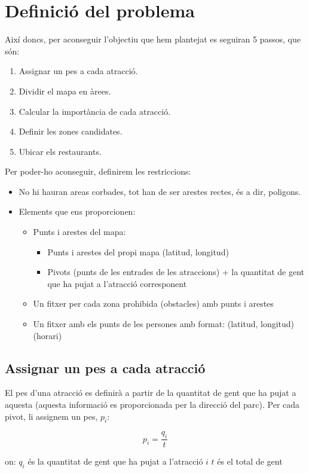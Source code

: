 \documentclass[12pt]{article}
\begin{document}
\clearpage
\section{Definició del problema}
Així doncs, per aconseguir l'objectiu que hem plantejat es seguiran 5 passos, que són:
\begin{enumerate}
	\item Assignar un pes a cada atracció.
	\item Dividir el mapa en àrees.
	\item Calcular la importància de cada atracció.
	\item Definir les zones candidates.
	\item Ubicar els restaurants.
\end{enumerate}
Per poder-ho aconseguir, definirem les restriccions:
\begin{itemize}
\item No hi hauran areas corbades, tot han  de ser arestes rectes, és a dir, poligons.
\item Elements que ens proporcionen:
	\begin{itemize}
	\item Punts i arestes del mapa: 
		\begin{itemize}
		\item Punts i arestes del propi mapa (latitud, longitud)
		\item Pivots (punts de les entrades de les atraccions) + la quantitat de gent que ha pujat a l'atracció corresponent
		\end{itemize}
	\item Un fitxer per cada zona prohibida (obstacles) amb punts i arestes
	\item Un fitxer amb els punts de les persones amb format: (latitud, longitud) (horari)
	\end{itemize}
\end{itemize}

\subsection{Assignar un pes a cada atracció}
El pes d'una atracció es definirà a partir de la quantitat de gent que ha pujat a aquesta (aquesta informació es proporcionada per la direcció del parc). Per cada pivot, li assignem un pes, $p_{i}$:
 
\[p_{i} = \frac{q_{i}}{t}\]

on:
$q_{i}$ és la quantitat de gent que ha pujat a l'atracció $i$
$t$ és el total de gent
\end{document}

